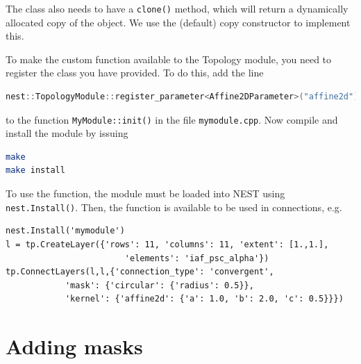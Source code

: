 \documentclass[a4paper,12pt]{report}
\begin{document}
The class also needs to have a \lstinline!clone()! method, which will return
a dynamically allocated copy of the object. We use the (default) copy
constructor to implement this.

To make the custom function available to the Topology module, you need to
register the class you have provided. To do this, add the line
\begin{lstlisting}[language=C++]
nest::TopologyModule::register_parameter<Affine2DParameter>("affine2d");
\end{lstlisting}
to the function \lstinline!MyModule::init()! in the file
\lstinline!mymodule.cpp!. Now compile and install the module by issuing
\begin{lstlisting}[language=bash]
make
make install
\end{lstlisting}
To use the function, the module must be loaded into NEST using
\lstinline!nest.Install()!. Then, the function is
available to be used in connections, e.g.
\begin{lstlisting}
nest.Install('mymodule')
l = tp.CreateLayer({'rows': 11, 'columns': 11, 'extent': [1.,1.],
                        'elements': 'iaf_psc_alpha'})
tp.ConnectLayers(l,l,{'connection_type': 'convergent',
            'mask': {'circular': {'radius': 0.5}},
            'kernel': {'affine2d': {'a': 1.0, 'b': 2.0, 'c': 0.5}}})
\end{lstlisting}

\section{Adding masks}
\end{document}
